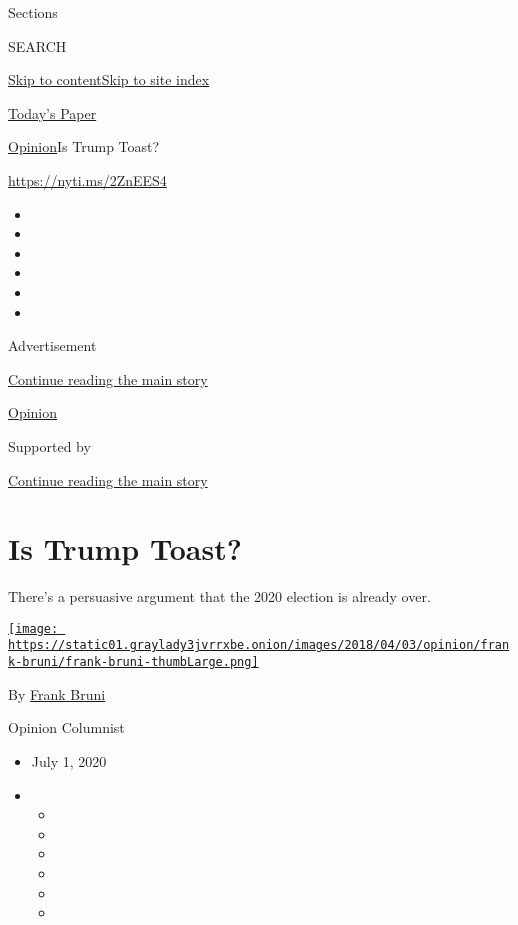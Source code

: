 Sections

SEARCH

\protect\hyperlink{site-content}{Skip to
content}\protect\hyperlink{site-index}{Skip to site index}

\href{https://myaccount.nytimes3xbfgragh.onion/auth/login?response_type=cookie\&client_id=vi}{}

\href{https://www.nytimes3xbfgragh.onion/section/todayspaper}{Today's
Paper}

\href{/section/opinion}{Opinion}\textbar{}Is Trump Toast?

\url{https://nyti.ms/2ZnEES4}

\begin{itemize}
\item
\item
\item
\item
\item
\item
\end{itemize}

Advertisement

\protect\hyperlink{after-top}{Continue reading the main story}

\href{/section/opinion}{Opinion}

Supported by

\protect\hyperlink{after-sponsor}{Continue reading the main story}

\hypertarget{is-trump-toast}{%
\section{Is Trump Toast?}\label{is-trump-toast}}

There's a persuasive argument that the 2020 election is already over.

\href{https://www.nytimes3xbfgragh.onion/by/frank-bruni}{\texttt{[image: https://static01.graylady3jvrrxbe.onion/images/2018/04/03/opinion/frank-bruni/frank-bruni-thumbLarge.png]}}

By \href{https://www.nytimes3xbfgragh.onion/by/frank-bruni}{Frank Bruni}

Opinion Columnist

\begin{itemize}
\item
  July 1, 2020
\item
  \begin{itemize}
  \item
  \item
  \item
  \item
  \item
  \item
  \end{itemize}
\end{itemize}

